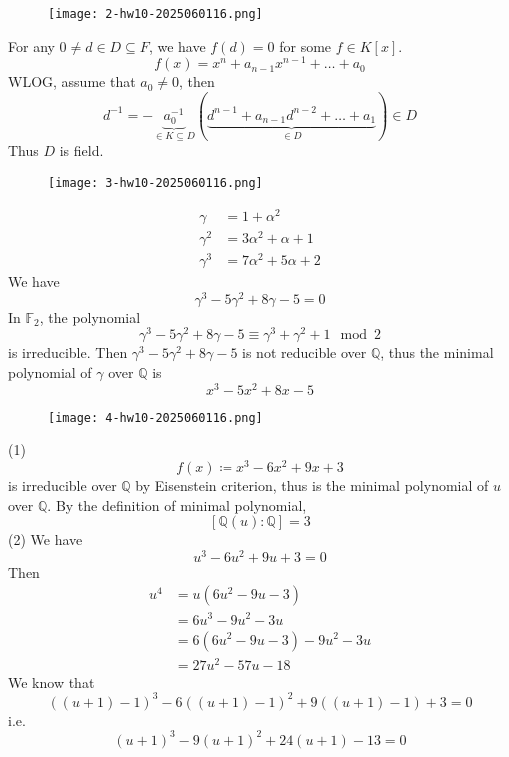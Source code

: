 \begin{exercise}
\begin{figure}[H]
\centering
\texttt{[image: 2-hw10-2025060116.png]}
\label{}
\end{figure}
\end{exercise}
For any $0\neq d\in D\subseteq F$, we have $f(d)=0$ for some $f\in K[x]$.
\[
f(x)=x^{n}+a_{n-1}x^{n-1}+\dots+a_0
\]
WLOG, assume that $a_0\neq0$, then
\[
d ^{-1}=-\underbrace{ a_0 ^{-1} }_{ \in K\subseteq D }(\underbrace{ d^{n-1}+a_{n-1}d^{n-2}+\dots+a_1 }_{ \in D })\in D
\]
Thus $D$ is field.

\begin{exercise}
\begin{figure}[H]
\centering
\texttt{[image: 3-hw10-2025060116.png]}
\label{}
\end{figure}
\end{exercise}
\[
\begin{aligned}  
\gamma & =1+\alpha^{2} \\
\gamma^{2} & =3\alpha^{2}+\alpha+1 \\
\gamma^{3} & =7\alpha^{2}+5\alpha+2
\end{aligned}
\]
We have
\[
\gamma^{3}-5\gamma^{2}+8\gamma-5=0
\]
In $\mathbb{F}_{2}$, the polynomial
\[
\gamma^{3}-5\gamma^{2}+8\gamma-5\equiv \gamma^{3}+\gamma^{2}+1\mod2
\]
is irreducible. Then $\gamma^{3}-5\gamma^{2}+8\gamma-5$ is not reducible over $\mathbb{Q}$, thus the minimal polynomial of $\gamma$ over $\mathbb{Q}$ is
\[
x^3-5x^2+8x-5
\]
\begin{exercise}
\begin{figure}[H]
\centering
\texttt{[image: 4-hw10-2025060116.png]}
\label{}
\end{figure}
\end{exercise}
(1)
\[
f(x)\coloneqq x^3-6x^2+9x+3
\]
is irreducible over $\mathbb{Q}$ by Eisenstein criterion, thus is the minimal polynomial of $u$ over $\mathbb{Q}$. By the definition of minimal polynomial,
\[
[\mathbb{Q}(u):\mathbb{Q}]=3
\]
(2)
We have
\[
u^3-6u^2+9u+3=0
\]
Then
\[
\begin{aligned}
u^{4} & =u(6u^2-9u-3) \\
 & =6u^3-9u^2-3u \\
 & =6(6u^2-9u-3)-9u^2-3u \\
 & =27u^2-57u-18
\end{aligned}
\]
We know that
\[
((u+1)-1)^3-6((u+1)-1)^2+9((u+1)-1)+3=0
\]
i.e.
\[
(u+1)^3-9(u+1)^2+24(u+1)-13=0
\]
